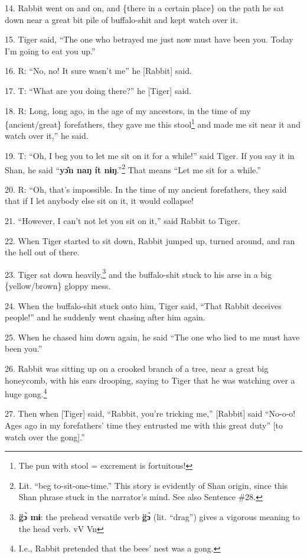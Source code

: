 14. Rabbit went on and on, and \{there in a certain place\} on the path he sat
down near a great bit pile of buffalo-shit and kept watch over it.

15. Tiger said, ``The one who betrayed me just now must have been you. Today I'm
going to eat you up.''

16. R: ``No, no! It sure wasn't me'' he [Rabbit] said.

17. T: ``What are you doing there?'' he [Tiger] said.

18. R: Long, long ago, in the age of my ancestors, in the time of my \{ancient/great\}
forefathers, they gave me this stool\footnote{The pun with stool = excrement is fortuitous!} and made me sit near it and watch over
it,'' he said.

19. T: ``Oh, I beg you to let me sit on it for a while!'' said Tiger. If you say
it in Shan, he said ``\textbf{yɔ̂n naŋ ít nɨŋ}.''\footnote{Lit. ``beg to-sit-one-time.'' This story is evidently of Shan origin, since this Shan phrase stuck in the narrator's mind. See also Sentence \#28.} That means ``Let me
sit for a while.''

20. R: ``Oh, that's impossible. In the time of my ancient forefathers, they said
that if I let anybody else sit on it, it would collapse!

21. ``However, I can't not let you sit on it,'' said Rabbit to Tiger.

22. When Tiger started to sit down, Rabbit jumped up, turned around, and ran the
hell out of there.

23. Tiger sat down heavily,\footnote{\textbf{  g̈ɔ̀ mɨ}: the prehead versatile verb \textbf{g̈ɔ̀} (lit. ``drag'') gives a vigorous meaning to the head verb. vV Vn} and the buffalo-shit stuck to his arse in a big
\{yellow/brown\} gloppy mess.

24. When the buffalo-shit stuck onto him, Tiger said, ``That Rabbit deceives people!''
and he suddenly went chasing after him again.

25. When he chased him down again, he said ``The one who lied to me must have been
you.''

26. Rabbit was sitting up on a crooked branch of a tree, near a great big honeycomb,
with his ears drooping, saying to Tiger that he was watching over a huge gong.\footnote{I.e., Rabbit pretended that the bees' nest was a gong.}

27. Then when [Tiger] said, ``Rabbit, you're tricking me,'' [Rabbit] said ``No-o-o!
Ages ago in my forefathers' time they entrusted me with this great duty'' [to watch
over the gong].''

